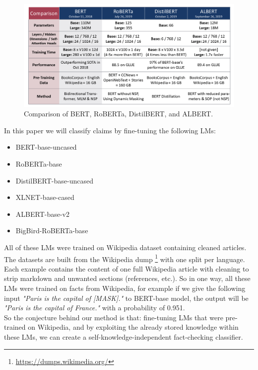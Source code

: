 \documentclass[conference]{IEEEtran}
\begin{document}
\begin{figure}[htp]
    \centering
    \includegraphics[scale=0.28]{lm_compar.png}
    \caption[Comparison]{Comparison of BERT, RoBERTa, DistilBERT, and ALBERT. \footnotemark}
    \label{fig:lm_compar}
\end{figure}

In this paper we will classify claims by fine-tuning the following LMs:

\begin{itemize}
\item BERT-base-uncased \cite{devlin2018bert}
\item RoBERTa-base \cite{liu2019roberta}
\item DistilBERT-base-uncased \cite{sanh2019distilbert}
\item XLNET-base-cased \cite{yang2019xlnet}
\item ALBERT-base-v2 \cite{lan2019albert}
\item BigBird-RoBERTa-base \cite{zaheer2020big}\\
\end{itemize}

All of these LMs were trained on Wikipedia dataset containing cleaned articles. The datasets are built from the Wikipedia dump \footnote{\url{https://dumps.wikimedia.org/}} with one split per language. Each example contains the content of one full Wikipedia article with cleaning to strip markdown and unwanted sections (references, etc.). So in one way, all these LMs were trained on facts from Wikipedia, for example if we give the following input \textit{"Paris is the capital of [MASK]."} to BERT-base model, the output will be \textit{"Paris is the capital of France."} with a probability of 0.951.\\
So the conjecture behind our method is that: fine-tuning LMs that were pre-trained on Wikipedia, and by exploiting the already stored knowledge within these LMs, we can create a self-knowledge-independent fact-checking classifier.
\end{document}
